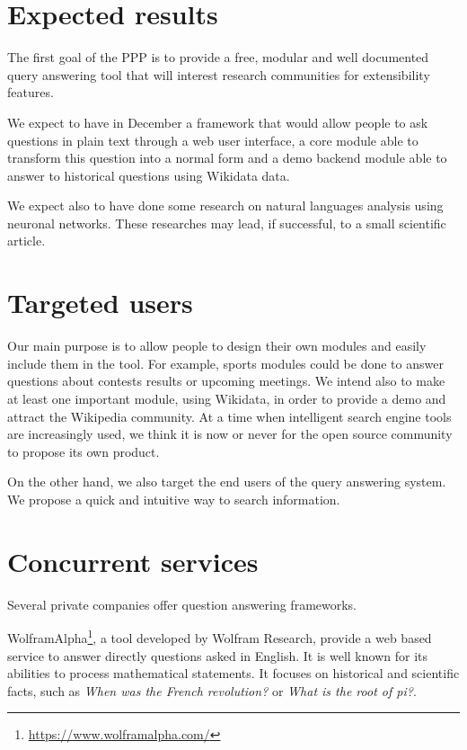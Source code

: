 \documentclass[a4paper,10pt]{article}
\begin{document}
\section{Expected results}
The first goal of the PPP is to provide a free, modular and well documented
query answering tool that will interest research communities for extensibility features. 

We expect to have in December a framework that would allow people to ask
questions in plain text through a web user interface, a core module able to transform
this question into a normal form and a demo backend module able to answer
to historical questions using Wikidata data.

We expect also to have done some research on natural languages analysis using
neuronal networks. These researches may lead, if successful, to
a small scientific article.

\section{Targeted users}

Our main purpose is to allow people to design their own modules and
easily include them in the tool. For example, sports modules could be done to 
answer questions about contests results or 
upcoming meetings.  We intend also to make at least one important module, using 
Wikidata, in order to provide a demo and attract the Wikipedia community. 
At a time when intelligent search engine tools are increasingly used, we think it 
is now or never for the open source community to propose its own product.

On the other hand, we also target the end users of the query answering system. We
propose a quick and intuitive way to search information.

\section{Concurrent services}

Several private companies offer question answering frameworks. 

WolframAlpha\footnote{\url{https://www.wolframalpha.com/}}, a tool developed by 
Wolfram Research, provide a web based service to answer directly questions asked
in English. It is well known for its abilities to process mathematical statements.
It focuses on historical and scientific facts, such as \emph{When was the French 
revolution?} or \emph{What is the root of pi?}.
\end{document}
